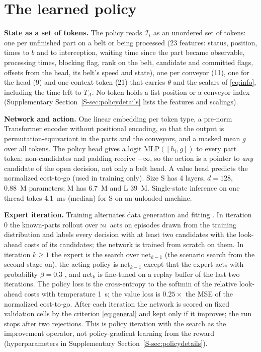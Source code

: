 \documentclass[11pt,a4paper]{article}
\theoremstyle{plain}
\theoremstyle{definition}
\theoremstyle{remark}
\newcommand{\nj}{\textsc{nj}}
\newcommand{\I}{\mathcal I}
\newcommand{\Supp}[1]{Supplementary Section~\ref{S-#1}}
\begin{document}
\section{The learned policy}\label{sec:policy}
\textbf{State as a set of tokens.} The policy reads $\I_t$ as an unordered set of tokens:
one per unfinished part on a belt or being processed (23 features: status, position,
times to $b$ and to interception, waiting time since the part became observable,
processing times, blocking flag, rank on the belt, candidate and committed flags, offsets
from the head, its belt's speed and state), one per conveyor (11), one for the head (9) and
one context token (21) that carries $\theta$ and the scalars of \eqref{eq:info}, including
the time left to $T_A$. No token holds a list position or a conveyor index
(\Supp{sec:policydetails} lists the features and scalings).

\textbf{Network and action.} One linear embedding per token type, a pre-norm Transformer
encoder without positional encoding, so that the output is permutation-equivariant in the
parts and the conveyors, and a masked mean $g$ over all tokens. The policy head gives a
logit $\mathrm{MLP}([h_i,g])$ to every part token; non-candidates and padding receive
$-\infty$, so the action is a pointer to \emph{any} candidate of the open decision, not only
a belt head. A value head predicts the normalized cost-to-go (used in training only). Size
S has 4 layers, $d=128$, 0.88~M parameters; M has 6.7~M and L 39~M. Single-state inference
on one thread takes 4.1~ms (median) for S on an unloaded machine.

\textbf{Expert iteration.} Training alternates data generation and fitting
\cite{Anthony2017,Silver2018}. In iteration 0 the known-parts rollout over \nj\ acts on
episodes drawn from the training distribution and labels every decision with at least two
candidates with the look-ahead costs of its candidates; the network is trained from
scratch on them. In iteration $k\ge1$ the expert is the search over
$\mathrm{net}_{k-1}$ (the scenario search from the second stage on), the acting policy is
$\mathrm{net}_{k-1}$ except that the expert acts with probability $\beta=0.3$
\cite{Ross2011}, and $\mathrm{net}_k$ is fine-tuned on a replay buffer of the last two
iterations. The policy loss is the cross-entropy to the softmin of the relative look-ahead
costs with temperature 1~s; the value loss is $0.25\times$ the MSE of the normalized
cost-to-go. After each iteration the network is scored on fixed validation cells by the
criterion \eqref{eq:general} and kept only if it improves; the run stops after two
rejections. This is policy iteration with the search as the improvement operator, not
policy-gradient learning from the reward (hyperparameters in \Supp{sec:policydetails}).
\end{document}
